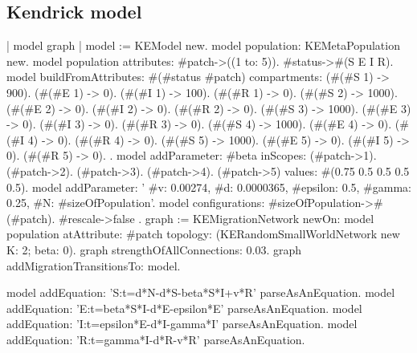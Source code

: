 \documentclass[a4paper,10pt,twoside]{book}
\begin{document}
\subsection{ Kendrick model}

\begin{code}{}
| model graph |
model := KEModel new.
model population: KEMetaPopulation new.
model population attributes: {
	#patch->((1 to: 5)).
	#status->#(S E I R)}.
model
	buildFromAttributes: #(#status #patch)
	compartments: {
		  (#(#S 1) -> 900). (#(#E 1) -> 0). (#(#I 1) -> 100). (#(#R 1) -> 0).
        (#(#S 2) -> 1000). (#(#E 2) -> 0). (#(#I 2) -> 0). (#(#R 2) -> 0).
        (#(#S 3) -> 1000). (#(#E 3) -> 0). (#(#I 3) -> 0). (#(#R 3) -> 0).
        (#(#S 4) -> 1000). (#(#E 4) -> 0). (#(#I 4) -> 0). (#(#R 4) -> 0).
        (#(#S 5) -> 1000). (#(#E 5) -> 0). (#(#I 5) -> 0). (#(#R 5) -> 0).
	}.
model
	addParameter: #beta
	inScopes: {
		(#patch->1).
		(#patch->2).
		(#patch->3).
		(#patch->4).
		(#patch->5)
	}
	values: #(0.75 0.5 0.5 0.5 0.5).
model addParameter: '{
	#v: 0.00274,
	#d: 0.0000365,
	#epsilon: 0.5,
	#gamma: 0.25,
	#N: #sizeOfPopulation}'.
model configurations: {
		#sizeOfPopulation->#(#patch).
		#rescale->false }.
graph := KEMigrationNetwork
				newOn: model population
				atAttribute: #patch
				topology: (KERandomSmallWorldNetwork new K: 2; beta: 0).
graph strengthOfAllConnections: 0.03.
graph addMigrationTransitionsTo: model.

model addEquation: 'S:t=d*N-d*S-beta*S*I+v*R' parseAsAnEquation.
model addEquation: 'E:t=beta*S*I-d*E-epsilon*E' parseAsAnEquation.
model addEquation: 'I:t=epsilon*E-d*I-gamma*I' parseAsAnEquation.
model addEquation: 'R:t=gamma*I-d*R-v*R' parseAsAnEquation.
\end{code}






\printindex
\end{document}
